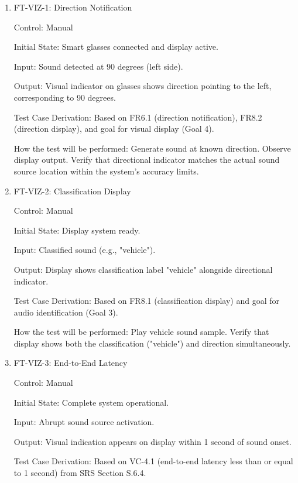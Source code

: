 \documentclass[12pt, titlepage]{article}
\begin{document}
\begin{enumerate}

\item{FT-VIZ-1: Direction Notification\\}

Control: Manual
					
Initial State: Smart glasses connected and display active.
					
Input: Sound detected at 90 degrees (left side).
					
Output: Visual indicator on glasses shows direction pointing to the left,
corresponding to 90 degrees.

Test Case Derivation: Based on FR6.1 (direction notification), FR8.2 (direction
display), and goal for visual display (Goal 4).

How the test will be performed: Generate sound at known direction. Observe display
output. Verify that directional indicator matches the actual sound source
location within the system's accuracy limits.

\item{FT-VIZ-2: Classification Display\\}

Control: Manual
					
Initial State: Display system ready.
					
Input: Classified sound (e.g., "vehicle").
					
Output: Display shows classification label "vehicle" alongside directional
indicator.

Test Case Derivation: Based on FR8.1 (classification display) and goal for audio
identification (Goal 3).

How the test will be performed: Play vehicle sound sample. Verify that display shows
both the classification ("vehicle") and direction simultaneously.

\item{FT-VIZ-3: End-to-End Latency\\}

Control: Manual
					
Initial State: Complete system operational.
					
Input: Abrupt sound source activation.
					
Output: Visual indication appears on display within 1 second of sound onset.

Test Case Derivation: Based on VC-4.1 (end-to-end latency less than or equal to 
1 second) from SRS Section S.6.4.


\end{enumerate}
\end{document}
